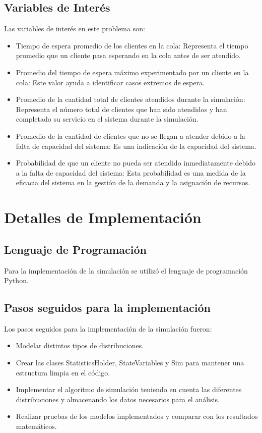 \documentclass[11pt]{article}
\begin{document}
    \subsection{Variables de Interés}
    Las variables de interés en este problema son:
    \begin{itemize}
        \item Tiempo de espera promedio de los clientes en la cola: Representa el tiempo promedio que un cliente pasa esperando en la cola antes de ser atendido.

\item Promedio del tiempo de espera máximo experimentado por un cliente en la cola: Este valor ayuda a identificar casos extremos de espera.

\item Promedio de la cantidad total de clientes atendidos durante la simulación: Representa el número total de clientes que han sido atendidos y han completado su servicio en el sistema durante la simulación.

\item Promedio de la cantidad de clientes que no se llegan a atender debido a la falta de capacidad del sistema: Es una indicación de la capacidad del sistema.

\item Probabilidad de que un cliente no pueda ser atendido inmediatamente debido a la falta de capacidad del sistema: Esta probabilidad es una medida de la eficacia del sistema en la gestión de la demanda y la asignación de recursos.

    \end{itemize}

    \section{Detalles de Implementación}
    \subsection{Lenguaje de Programación}
    Para la implementación de la simulación se utilizó el lenguaje de programación Python.

    \subsection{Pasos seguidos para la implementación}
    Los pasos seguidos para la implementación de la simulación fueron:
    \begin{itemize}
        \item Modelar distintos tipos de distribuciones.
        \item Crear las clases StatisticsHolder, StateVariables y Sim para mantener una estructura limpia en el código.
        \item Implementar el algoritmo de simulación teniendo en cuenta las diferentes distribuciones y almacenando los datos necesarios para el análisis.
        \item Realizar pruebas de los modelos implementados y comparar con los resultados matemáticos.
    \end{itemize}
\end{document}
